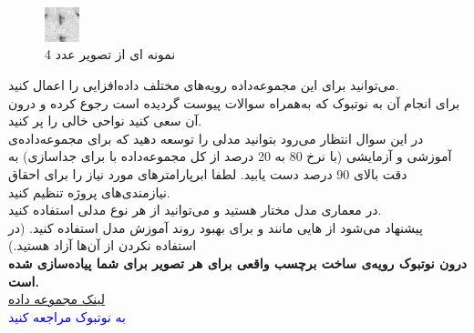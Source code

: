 \documentclass[12pt]{article}
\begin{document}
\begin{enumerate}
    \begin{figure}[h]
        \centering
        \includegraphics[width=1cm]{figs/num_pic.jpg}
        \caption{نمونه ای از تصویر عدد 4}
        \label{fig:num_pic}  
    \end{figure}

    
    می‌توانید برای این مجموعه‌داده رویه‌های مختلف داده‌افزایی را اعمال کنید.\\
    برای انجام آن به نوتبوک  که به‌همراه سوالات پیوست گردیده است رجوع کرده و درون آن سعی کنید نواحی خالی را پر کنید.\\
    در این سوال انتظار می‌رود بتوانید مدلی را توسعه دهید که برای مجموعه‌داده‌ی آموزشی و آزمایشی (با نرخ 80 به 20 درصد از کل مجموعه‌داده با  برای جداسازی) به دقت بالای 90 درصد دست یابید.
    لطفا ابرپارامترهای مورد نیاز را برای احقاق نیازمندی‌های پروژه تنظیم کنید.\\
    در معماری مدل مختار هستید و می‌توانید از هر نوع مدلی استفاده کنید.\\
    پیشنهاد می‌شود از  هایی مانند  و  برای بهبود روند آموزش مدل استفاده کنید. (در استفاده نکردن از آن‌ها آزاد هستید.)\\
    \textbf{درون نوتبوک رویه‌ی ساخت برچسب واقعی برای هر تصویر برای شما پیاده‌سازی شده است.}\\
    \href{https://drive.google.com/drive/folders/1B66Pref_4TTUszYh5Tb08udCIIphXkl9?usp=sharing}{لینک مجموعه داده}\\
    \textcolor{blue}{
    به نوتبوک  مراجعه کنید
    }


\end{enumerate}
\end{document}
